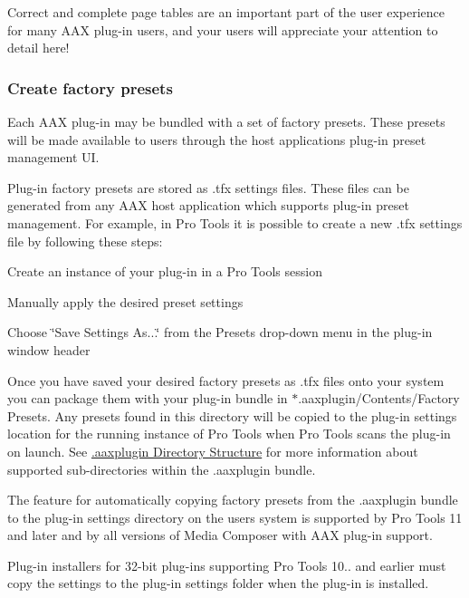  Correct and complete page tables are an important part of the user experience for many A\+A\+X plug-\/in users, and your users will appreciate your attention to detail here!

\hypertarget{a00372_aax_distributing_finishing_factorypresets}{}\subsubsection{Create factory presets}\label{a00372_aax_distributing_finishing_factorypresets}
 Each A\+A\+X plug-\/in may be bundled with a set of factory presets. These presets will be made available to users through the host application\textquotesingle{}s plug-\/in preset management U\+I.

 Plug-\/in factory presets are stored as .tfx settings files. These files can be generated from any A\+A\+X host application which supports plug-\/in preset management. For example, in Pro Tools it is possible to create a new .tfx settings file by following these steps\+:

 
\begin{DoxyEnumerate}
\item Create an instance of your plug-\/in in a Pro Tools session  
\item Manually apply the desired preset settings  
\item Choose \char`\"{}\+Save Settings As...\char`\"{} from the Presets drop-\/down menu in the plug-\/in window header  
\end{DoxyEnumerate}

 Once you have saved your desired factory presets as .tfx files onto your system you can package them with your plug-\/in bundle in $\ast$.aaxplugin/\+Contents/\+Factory Presets. Any presets found in this directory will be copied to the plug-\/in settings location for the running instance of Pro Tools when Pro Tools scans the plug-\/in on launch. See \hyperlink{a00331_commoninterface_formatspecification__aaxplugin_directory_structure}{.aaxplugin Directory Structure} for more information about supported sub-\/directories within the .aaxplugin bundle.

 The feature for automatically copying factory presets from the .aaxplugin bundle to the plug-\/in settings directory on the user\textquotesingle{}s system is supported by Pro Tools 11 and later and by all versions of Media Composer with A\+A\+X plug-\/in support.

 Plug-\/in installers for 32-\/bit plug-\/ins supporting Pro Tools 10.. and earlier must copy the settings to the plug-\/in settings folder when the plug-\/in is installed.

